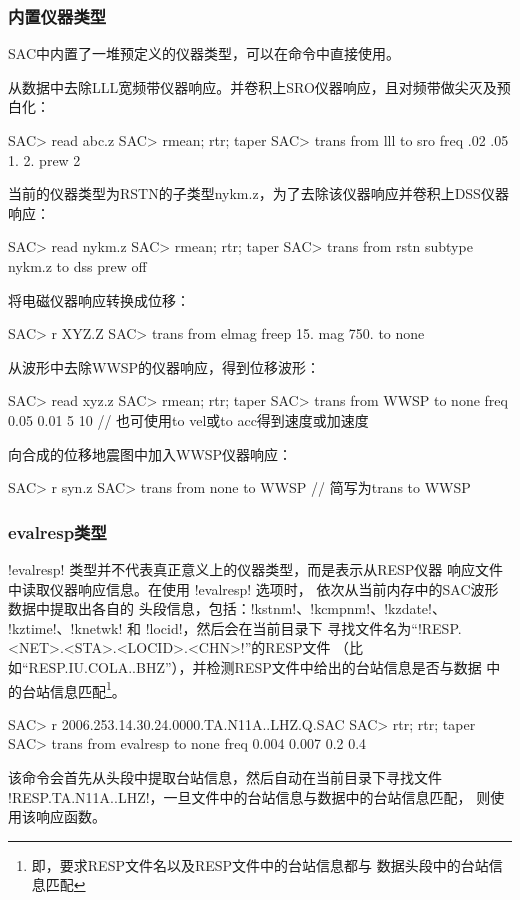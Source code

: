 \subsubsection{内置仪器类型}
SAC中内置了一堆预定义的仪器类型，可以在命令中直接使用。

从数据中去除LLL宽频带仪器响应。并卷积上SRO仪器响应，且对频带做尖灭及预白化：
\begin{SACCode}
SAC> read abc.z
SAC> rmean; rtr; taper
SAC> trans from lll to sro freq .02 .05 1. 2. prew 2
\end{SACCode}

当前的仪器类型为RSTN的子类型nykm.z，为了去除该仪器响应并卷积上DSS仪器响应：
\begin{SACCode}
SAC> read nykm.z
SAC> rmean; rtr; taper
SAC> trans from rstn subtype nykm.z to dss prew off
\end{SACCode}

将电磁仪器响应转换成位移：
\begin{SACCode}
SAC> r XYZ.Z
SAC> trans from elmag freep 15. mag 750. to none
\end{SACCode}

从波形中去除WWSP的仪器响应，得到位移波形：
\begin{SACCode}
SAC> read xyz.z
SAC> rmean; rtr; taper
SAC> trans from WWSP to none freq 0.05 0.01 5 10
                // 也可使用to vel或to acc得到速度或加速度
\end{SACCode}

向合成的位移地震图中加入WWSP仪器响应：
\begin{SACCode}
SAC> r syn.z
SAC> trans from none to WWSP    // 简写为trans to WWSP
\end{SACCode}

\subsubsection{evalresp类型}
!evalresp! 类型并不代表真正意义上的仪器类型，而是表示从RESP仪器
响应文件中读取仪器响应信息。在使用 !evalresp! 选项时，
 依次从当前内存中的SAC波形数据中提取出各自的
头段信息，包括：!kstnm!、!kcmpnm!、!kzdate!、
!kztime!、!knetwk! 和 !locid!，然后会在当前目录下
寻找文件名为``!RESP.<NET>.<STA>.<LOCID>.<CHN>!''的RESP文件
（比如``RESP.IU.COLA..BHZ''），并检测RESP文件中给出的台站信息是否与数据
中的台站信息匹配\footnote{即，要求RESP文件名以及RESP文件中的台站信息都与
数据头段中的台站信息匹配}。
\begin{SACCode}
SAC> r 2006.253.14.30.24.0000.TA.N11A..LHZ.Q.SAC
SAC> rtr; rtr; taper
SAC> trans from evalresp to none freq 0.004 0.007 0.2 0.4
\end{SACCode}
该命令会首先从头段中提取台站信息，然后自动在当前目录下寻找文件
!RESP.TA.N11A..LHZ!，一旦文件中的台站信息与数据中的台站信息匹配，
则使用该响应函数。

